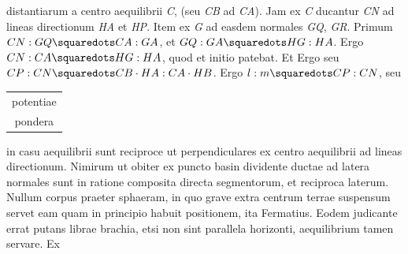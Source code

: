 distantiarum a centro aequilibrii \textit{C}, (seu \textit{CB} ad \textit{CA}). Jam ex \textit{C} ducantur \textit{CN}
ad lineas directionum \textit{HA} et \textit{HP}. Item ex \textit{G} ad easdem normales \textit{GQ}, \textit{GR}. Primum $CN: GQ \squaredots CA : GA$, et $GQ : GA \squaredots HG : HA$. Ergo $CN : CA \squaredots HG : HA$, quod et initio patebat. Et
Ergo
seu $CP : CN \squaredots CB\cdot HA : CA\cdot HB$. Ergo $l : m \squaredots CP : CN$, seu
\begin{tabular}{c}
potentiae\\ pondera
\end{tabular}
in casu aequilibrii sunt reciproce ut perpendiculares ex centro aequilibrii ad lineas directionum. Nimirum ut obiter
ex puncto basin dividente ductae ad latera normales sunt in ratione composita directa segmentorum, et reciproca laterum. Nullum corpus praeter sphaeram, in quo grave extra centrum terrae suspensum servet eam quam in principio habuit positionem, ita Fermatius. Eodem judicante errat
putans librae brachia, etsi non sint parallela horizonti, aequilibrium tamen servare. Ex

